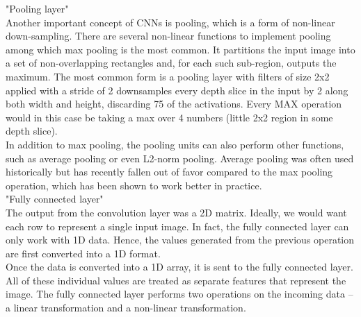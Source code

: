 "Pooling layer"\\

Another important concept of CNNs is pooling, which is a form of non-linear down-sampling. There are several non-linear functions to implement pooling among which max pooling is the most common. It partitions the input image into a set of non-overlapping rectangles and, for each such sub-region, outputs the maximum. The most common form is a pooling layer with filters of size 2x2 applied with a stride of 2 downsamples every depth slice in the input by 2 along both width and height, discarding 75 %
of the activations. Every MAX operation would in this case be taking a max over 4 numbers (little 2x2 region in some depth slice). \\

In addition to max pooling, the pooling units can also perform other functions, such as average pooling or even L2-norm pooling. Average pooling was often used historically but has recently fallen out of favor compared to the max pooling operation, which has been shown to work better in practice.\\

"Fully connected layer"\\

The output from the convolution layer was a 2D matrix. Ideally, we would want each row to represent a single input image. In fact, the fully connected layer can only work with 1D data. Hence, the values generated from the previous operation are first converted into a 1D format.\\

Once the data is converted into a 1D array, it is sent to the fully connected layer. All of these individual values are treated as separate features that represent the image. The fully connected layer performs two operations on the incoming data – a linear transformation and a non-linear transformation.\\
